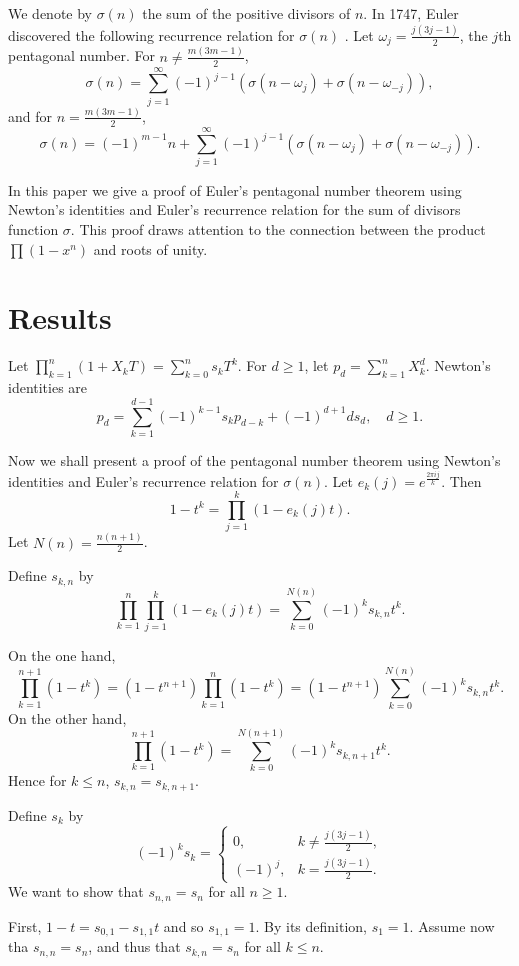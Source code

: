 \documentclass{article}
\begin{document}
We denote by $\sigma(n)$ the sum of the positive divisors of $n$.
In 1747, Euler discovered the following recurrence relation
for $\sigma(n)$ \cite[pp. 345--356]{bell}.
Let $\omega_j=\frac{j(3j-1)}{2}$, the $j$th pentagonal number.
For $n \neq \frac{m(3m-1)}{2}$,
\[
\sigma(n)=\sum_{j=1}^\infty (-1)^{j-1}(\sigma(n-\omega_j)+\sigma(n-\omega_{-j})),
\]
and for $n=\frac{m(3m-1)}{2}$,
\[
\sigma(n)=(-1)^{m-1}n+\sum_{j=1}^\infty (-1)^{j-1}(\sigma(n-\omega_j)+
\sigma(n-\omega_{-j})).
\]

In this paper we give a proof of Euler's pentagonal number theorem using
Newton's identities and Euler's recurrence relation for the sum of divisors function
$\sigma$. This proof draws attention to the connection between the product
$\prod (1-x^n)$ and roots of unity.

\section{Results}
Let $\prod_{k=1}^n (1+X_k T)=\sum_{k=0}^n s_k T^k$.
For $d \geq 1$, let $p_d=\sum_{k=1}^n X_k^d$.
Newton's identities \cite[IV.65]{MR643362} are
\begin{equation}
\label{newton}
p_d=\sum_{k=1}^{d-1} (-1)^{k-1} s_k p_{d-k} +(-1)^{d+1} ds_d,
\quad d \geq 1.
\end{equation}

Now we shall present a proof of the pentagonal number theorem
using Newton's identities and Euler's recurrence relation for $\sigma(n)$.
Let $e_k(j)=e^{\frac{2\pi ij}{k}}$. Then
\[
1-t^k=\prod_{j=1}^k (1-e_k(j)t).
\]
Let $N(n)=\frac{n(n+1)}{2}$.

Define $s_{k,n}$ by
\[
\prod_{k=1}^n \prod_{j=1}^k (1-e_k(j)t)
=\sum_{k=0}^{N(n)} (-1)^k s_{k,n} t^k.
\]

On the one hand,
\[
\prod_{k=1}^{n+1}(1-t^k)=(1-t^{n+1})\prod_{k=1}^n (1-t^k)
=(1-t^{n+1})\sum_{k=0}^{N(n)} (-1)^k s_{k,n} t^k.
\]
On the other hand,
\[
\prod_{k=1}^{n+1}(1-t^k)=\sum_{k=0}^{N(n+1)} (-1)^k s_{k,n+1} t^k.
\]
Hence for $k \leq n$, $s_{k,n}=s_{k,n+1}$.

Define $s_k$ by
\[
(-1)^k s_k=\begin{cases}0,&k \neq \frac{j(3j-1)}{2},\\
(-1)^j,&k=\frac{j(3j-1)}{2}.
\end{cases}
\]
We want to show that $s_{n,n}=s_n$ for all $n \geq 1$.

First, $1-t=s_{0,1}-s_{1,1}t$ and so $s_{1,1}=1$. By its definition,
$s_1=1$. Assume now tha
$s_{n,n}=s_n$, and thus that
$s_{k,n}=s_n$ for all $k \leq n$. 
\end{document}
